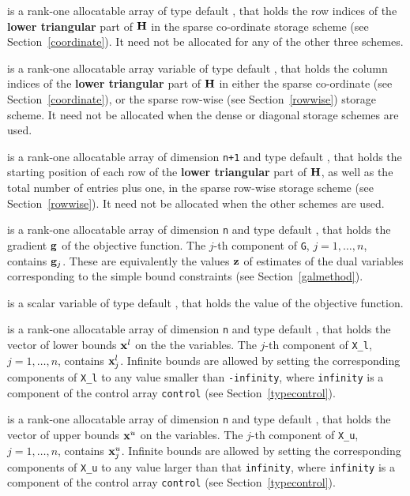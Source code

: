 \documentclass{galahad}
\begin{document}
\begin{description}
\begin{description}
 is a rank-one allocatable array of type default \integer,
that holds the row indices of the {\bf lower triangular} part of ${\mathbf{H}}$
in the sparse co-ordinate storage
scheme (see Section~\ref{coordinate}).
It need not be allocated for any of the other three schemes.

 is a rank-one allocatable array variable of type default \integer,
that holds the column indices of the {\bf lower triangular} part of
${\mathbf{H}}$ in either the sparse co-ordinate
(see Section~\ref{coordinate}), or the sparse row-wise
(see Section~\ref{rowwise}) storage scheme.
It need not be allocated when the dense or diagonal storage schemes are used.

 is a rank-one allocatable array of dimension {\tt n+1} and type
default \integer, that holds the starting position of
each row of the {\bf lower triangular} part of ${\mathbf{H}}$, as well
as the total number of entries plus one, in the sparse row-wise storage
scheme (see Section~\ref{rowwise}). It need not be allocated when the
other schemes are used.

\end{description}

 is a rank-one allocatable array of dimension {\tt n} and type
default \realdp, that holds the gradient ${\mathbf{g}}$
of the objective function.
The $j$-th component of
{\tt G}, $j = 1,  \ldots ,  n$, contains ${\mathbf{g}}_{j}$.
These are equivalently the values ${\mathbf{z}}$ of estimates  of the dual variables
corresponding to the simple bound constraints (see Section~\ref{galmethod}).

 is a scalar variable of type
default \realdp, that holds the value of the objective function.

 is a rank-one allocatable array of dimension {\tt n} and type
default \realdp, that holds
the vector of lower bounds ${\mathbf{x}}^{l}$ on the the variables.
The $j$-th component of {\tt X\_l}, $j = 1, \ldots , n$,
contains ${\mathbf{x}}_{j}^{l}$.
Infinite bounds are allowed by setting the corresponding
components of {\tt X\_l} to any value smaller than {\tt -infinity},
where {\tt infinity} is a component of the control array {\tt control}
(see Section~\ref{typecontrol}).

 is a rank-one allocatable array of dimension {\tt n} and type
default \realdp, that holds
the vector of upper bounds ${\mathbf{x}}^{u}$ on the variables.
The $j$-th component of {\tt X\_u}, $j = 1, \ldots , n$,
contains ${\mathbf{x}}_{j}^{u}$.
Infinite bounds are allowed by setting the corresponding
components of {\tt X\_u} to any value larger than that {\tt infinity},
where {\tt infinity} is a component of the control array {\tt control}
(see Section~\ref{typecontrol}).


\end{description}
\end{document}

